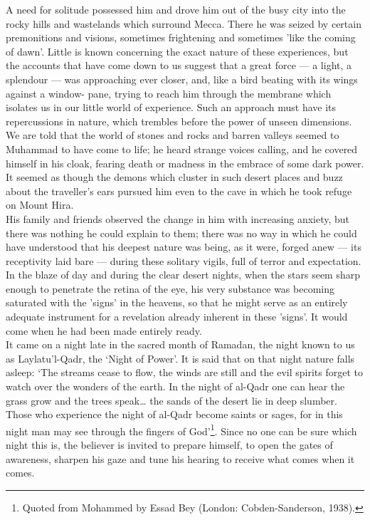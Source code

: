 \documentclass[10pt, twoside]{book}
\begin{document}
A need for solitude possessed him and drove him out of the busy city into the rocky hills and 
wastelands which surround Mecca. There he was seized by certain premonitions and visions, sometimes 
frightening and sometimes 'like the coming of dawn'. Little is known concerning the exact nature of 
these experiences, but the accounts that have come down to us suggest that a great force --- a light, a 
splendour --- was approaching ever closer, and, like a bird beating with its wings against a window\hyp{}
pane, trying to reach him through the membrane which isolates us in our little world of experience. 
Such an approach must have its repercussions in nature, which trembles before the power of unseen 
dimensions. We are told that the world of stones and rocks and barren valleys seemed to Muhammad to 
have come to life; he heard strange voices calling, and he covered himself in his cloak, fearing 
death or madness in the embrace of some dark power. It seemed as though the demons which cluster in 
such desert places and buzz about the traveller's ears pursued him even to the cave in which he took 
refuge on Mount Hira. \\

His family and friends observed the change in him with increasing anxiety, but there was nothing he 
could explain to them; there was no way in which he could have understood that his deepest nature was 
being, as it were, forged anew --- its receptivity laid bare --- during these solitary vigils, full of 
terror and expectation. In the blaze of day and during the clear desert nights, when the stars seem 
sharp enough to penetrate the retina of the eye, his very substance was becoming saturated with the 
'signs' in the heavens, so that he might serve as an entirely adequate instrument for a revelation 
already inherent in these 'signs'. It would come when he had been made entirely ready. \\

It came on a night late in the sacred month of Ramadan, the night known to us as Laylatu'l\hyp{}Qadr, the 
`Night of Power'. It is said that on that night nature falls asleep: `The streams cease to flow, the 
winds are still and the evil spirits forget to watch over the wonders of the earth. In the night of 
al\hyp{}Qadr one can hear the grass grow and the trees speak\ldots{} the sands of the desert lie in deep 
slumber. Those who experience the night of al\hyp{}Qadr become saints or sages, for in this night man may 
see through the fingers of God'\footnote{Quoted from Mohammed by Essad Bey (London: Cobden\hyp{}Sanderson, 1938).}. Since no one can be sure which night this is, the believer is 
invited to prepare himself, to open the gates of awareness, sharpen his gaze and tune his hearing to 
receive what comes when it comes. \\
\end{document}
